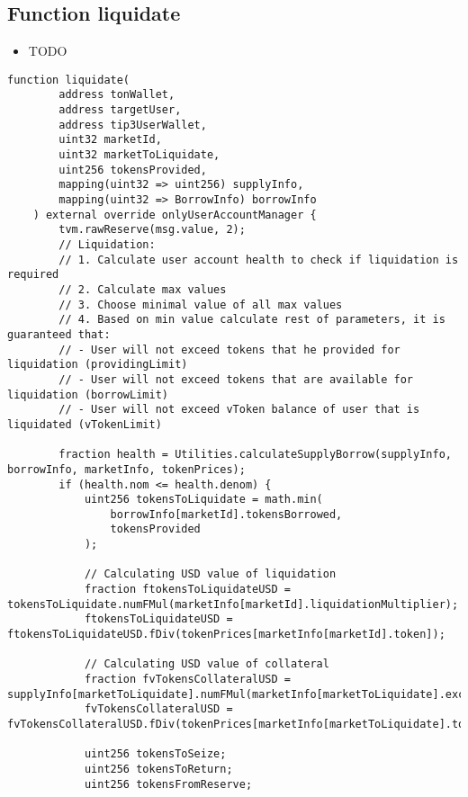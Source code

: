 \subsection{Function liquidate}

\noindent\begin{itemize}
\item TODO
\end{itemize}

\begin{lstlisting}[firstnumber=101]
    function liquidate(
        address tonWallet, 
        address targetUser, 
        address tip3UserWallet, 
        uint32 marketId, 
        uint32 marketToLiquidate,
        uint256 tokensProvided, 
        mapping(uint32 => uint256) supplyInfo, 
        mapping(uint32 => BorrowInfo) borrowInfo
    ) external override onlyUserAccountManager {
        tvm.rawReserve(msg.value, 2);
        // Liquidation:
        // 1. Calculate user account health to check if liquidation is required
        // 2. Calculate max values
        // 3. Choose minimal value of all max values
        // 4. Based on min value calculate rest of parameters, it is guaranteed that:
        // - User will not exceed tokens that he provided for liquidation (providingLimit)
        // - User will not exceed tokens that are available for liquidation (borrowLimit)
        // - User will not exceed vToken balance of user that is liquidated (vTokenLimit)

        fraction health = Utilities.calculateSupplyBorrow(supplyInfo, borrowInfo, marketInfo, tokenPrices);
        if (health.nom <= health.denom) {
            uint256 tokensToLiquidate = math.min(
                borrowInfo[marketId].tokensBorrowed,
                tokensProvided
            );

            // Calculating USD value of liquidation
            fraction ftokensToLiquidateUSD = tokensToLiquidate.numFMul(marketInfo[marketId].liquidationMultiplier);
            ftokensToLiquidateUSD = ftokensToLiquidateUSD.fDiv(tokenPrices[marketInfo[marketId].token]);

            // Calculating USD value of collateral
            fraction fvTokensCollateralUSD = supplyInfo[marketToLiquidate].numFMul(marketInfo[marketToLiquidate].exchangeRate);
            fvTokensCollateralUSD = fvTokensCollateralUSD.fDiv(tokenPrices[marketInfo[marketToLiquidate].token]);

            uint256 tokensToSeize;
            uint256 tokensToReturn;
            uint256 tokensFromReserve;


\end{lstlisting}
